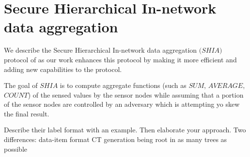 \chapter{Secure Hierarchical In-network data aggregation} %
\label{cha:Secure Hierarchical In-network data aggregation}

We describe the Secure Hierarchical In-network data aggregation $\textit{(SHIA)}$ protocol of \cite{chan2006secure} as our work enhances this protocol by making it more efficient and adding new capabilities to the protocol.

The goal of $\textit{SHIA}$ is to compute aggregate functions (such as $\textit{SUM}$, $\textit{AVERAGE}$, $\textit{COUNT}$) of the sensed values by the sensor nodes while assuming that a portion of the sensor nodes are controlled by an adversary which is attempting yo skew the final result.

Describe their label format with an example.
Then elaborate your approach.
Two differences:
	data-item format
	CT generation being root in as many trees as possible
